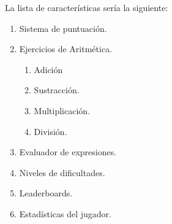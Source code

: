 \documentclass{article}
\begin{document}
La lista de características sería la siguiente:
\begin{enumerate}
	\item Sistema de puntuación.
	\item Ejercicios de Aritmética.
	\begin{enumerate}
		\item Adición 
		\item Sustracción.
		\item Multiplicación.
		\item División.
	\end{enumerate}
	\item Evaluador de expresiones.
	\item Niveles de dificultades.
	\item Leaderboards.
	\item Estadísticas del jugador.
\end{enumerate}
\pagebreak
\end{document}
